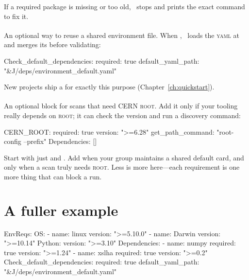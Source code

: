 \noindent If a required package is missing or too old, \Jarvis\ stops and prints the exact
 command to fix it.

\paragraph{} An optional way to reuse a shared environment
file. When , \Jarvis\ loads the \textsc{yaml} at
 and merges its  before validating:

\begin{yamlwin}
  Check_default_dependencies:
    required: true
    default_yaml_path: "&J/deps/environment_default.yaml"
\end{yamlwin}

\noindent New projects ship a  for exactly this purpose
(Chapter~\ref{ch:quickstart}).

\paragraph{} An optional block for scans that need CERN \textsc{root}. Add it
only if your tooling really depends on \textsc{root}; it can check the version and run a discovery
command:

\begin{yamlwin}
  CERN_ROOT:
    required: true
    version: ">=6.28"
    get_path_command: "root-config --prefix"
    Dependencies: []
\end{yamlwin}

\begin{jtip}
Start with just  and . Add  when
your group maintains a shared default card, and  only when a scan truly needs
\textsc{root}. Less is more here---each requirement is one more thing that can block a run.
\end{jtip}

\section{A fuller example}
\label{sec:env-example}

\begin{yamlwin}
EnvReqs:
  OS:
    - name: linux
      version: ">=5.10.0"
    - name: Darwin
      version: ">=10.14"
  Python:
    version: ">=3.10"
    Dependencies:
      - name: numpy
        required: true
        version: ">=1.24"
      - name: xslha
        required: true
        version: ">=0.2"
  Check_default_dependencies:
    required: true
    default_yaml_path: "&J/deps/environment_default.yaml"
\end{yamlwin}


